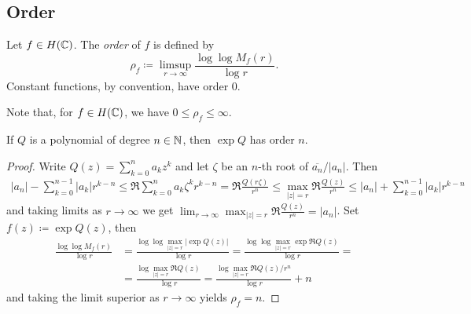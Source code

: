 \subsection{Order}

\begin{definition} \label{def:order}
    Let $f \in H(\mathbb{C})$. The \emph{order} of $f$ is defined by
    \begin{equation} \label{eq:def-order}
        \rho_f \coloneqq \limsup_{r \to \infty} \frac{\log \log M_f(r)}{\log r}.
    \end{equation}
    Constant functions, by convention, have order 0.
\end{definition}

Note that, for $f \in H(\mathbb{C})$, we have $0 \leq \rho_f \leq \infty$.

\begin{proposition} \label{prop:order-exponential-polynomial}
    If $Q$ is a polynomial of degree $n \in \mathbb{N}$, then $\exp Q$ has order $n$.
\end{proposition}

\begin{proof}
    Write $Q(z) = \sum_{k=0}^n a_k z^k$ and let $\zeta$ be an $n$-th root of $\overline{a_n} / \vert a_n \vert$. Then
    \begin{align*}
        \vert a_n \vert - \sum_{k=0}^{n-1} \vert a_k \vert r^{k-n} \leq \Re \sum_{k=0}^{n} a_k \zeta^k r^{k-n} = \Re \frac{Q(r \zeta)}{r^n} \leq \max_{\vert z \vert = r} \Re \frac{Q(z)}{r^n} \leq \vert a_n \vert + \sum_{k=0}^{n-1} \vert a_k \vert r^{k-n}
    \end{align*}
    and taking limits as $r \to \infty$ we get $\lim_{r \to \infty} \max_{\vert z \vert = r} \Re \frac{Q(z)}{r^n} = \vert a_n \vert$. Set $f(z) \coloneqq \exp Q(z)$, then
    \begin{align*}
        \frac{\log \log M_f(r)}{\log r} &= \frac{\log \log \max_{\vert z \vert = r} \vert \exp Q(z) \vert}{\log r} = \frac{\log \log \max_{\vert z \vert = r} \exp \Re Q(z)}{\log r} = \\
        &= \frac{\log \max_{\vert z \vert = r} \Re Q(z)}{\log r} = \frac{\log \max_{\vert z \vert = r} \Re Q(z) / r^n}{\log r} + n
    \end{align*}
    and taking the limit superior as $r \to \infty$ yields $\rho_f = n$.
\end{proof}



